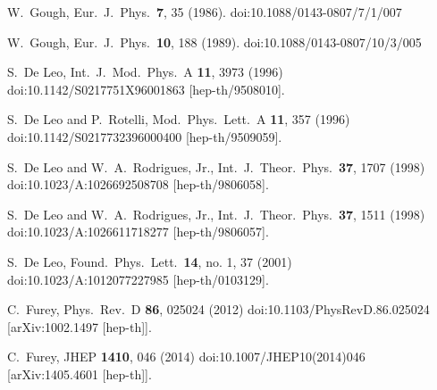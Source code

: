 \documentclass[epsfig,12pt]{article}
\begin{document}
\begin{thebibliography}{99}
  W.~Gough,
  Eur.\ J.\ Phys.\ {\bf 7}, 35 (1986).
  doi:10.1088/0143-0807/7/1/007

  W.~Gough,
  Eur.\ J.\ Phys.\ {\bf 10}, 188 (1989).
  doi:10.1088/0143-0807/10/3/005

  S.~De Leo,
  Int.\ J.\ Mod.\ Phys.\ A {\bf 11}, 3973 (1996)
  doi:10.1142/S0217751X96001863
  [hep-th/9508010].

  S.~De Leo and P.~Rotelli,
  Mod.\ Phys.\ Lett.\ A {\bf 11}, 357 (1996)
  doi:10.1142/S0217732396000400
  [hep-th/9509059].

  S.~De Leo and W.~A.~Rodrigues, Jr.,
  Int.\ J.\ Theor.\ Phys.\  {\bf 37}, 1707 (1998)
  doi:10.1023/A:1026692508708
  [hep-th/9806058].

  S.~De Leo and W.~A.~Rodrigues, Jr.,
  Int.\ J.\ Theor.\ Phys.\  {\bf 37}, 1511 (1998)
  doi:10.1023/A:1026611718277
  [hep-th/9806057].

  S.~De Leo,
  Found.\ Phys.\ Lett.\  {\bf 14}, no. 1, 37 (2001)
  doi:10.1023/A:1012077227985
  [hep-th/0103129].

  C.~Furey,
  Phys.\ Rev.\ D {\bf 86}, 025024 (2012)
  doi:10.1103/PhysRevD.86.025024
  [arXiv:1002.1497 [hep-th]].

  C.~Furey,
  JHEP {\bf 1410}, 046 (2014)
  doi:10.1007/JHEP10(2014)046
  [arXiv:1405.4601 [hep-th]].


\end{thebibliography}
\end{document}
